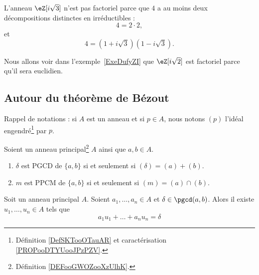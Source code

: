 \begin{example} \label{EXooCWJUooCDJqkr}
	L'anneau \( \eZ[i\sqrt{3}]\) n'est pas factoriel parce que \( 4\) a au moins deux décompositions distinctes en irréductibles :
	\begin{equation}
		4=2\cdot 2,
	\end{equation}
	et
	\begin{equation}
		4=(1+i\sqrt{3})(1-i\sqrt{3}).
	\end{equation}
\end{example}

Nous allons voir dans l'exemple~\ref{ExeDufyZI} que \( \eZ[i\sqrt{2}]\) est factoriel parce qu'il sera euclidien.

\subsection{Autour du théorème de Bézout}

Rappel de notations : si \( A\) est un anneau et si \( p\in A\), nous notons \( (p)\) l'idéal engendré\footnote{Définition \ref{DefSKTooOTauAR} et caractérisation \ref{PROPooDTYUooJPzPZV}.} par \( p\).

\begin{lemma}         \label{LEMooARNUooXqrJGa}
	Soient un anneau principal\footnote{Définition \ref{DEFooGWOZooXzUlhK}.} \( A\) ainsi que \( a,b\in A\).
	\begin{enumerate}
		\item		\label{ITEMooEZAPooJuvceO}
		      \( \delta\) est PGCD de \( \{ a,b \}\) si et seulement si \( (\delta)=(a)+(b)\).
		\item
		      \( m\) est PPCM de \( \{ a,b \}\) si et seulement si \( (m)=(a)\cap (b)\).
	\end{enumerate}
\end{lemma}

\begin{proposition}	\label{PROPooXQKMooWJlEFq}
	Soit un anneau principal \( A\). Soient \( a_1,\ldots,a_n\in A\) et \( \delta\in \pgcd(a,b)\). Alors il existe \( u_1,\ldots,u_n\in A\) tels que
	\begin{equation}
		a_1u_1+\ldots+a_nu_n=\delta
	\end{equation}
\end{proposition}

